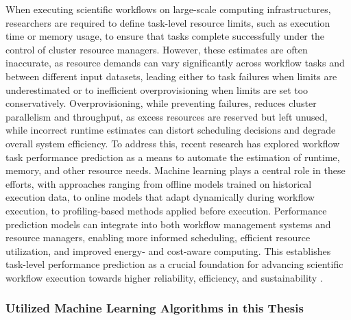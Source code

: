 When executing scientific workflows on large-scale computing infrastructures, researchers are required to define task-level resource limits, such as execution time or memory usage, to ensure that tasks complete successfully under the control of cluster resource managers. However, these estimates are often inaccurate, as resource demands can vary significantly across workflow tasks and between different input datasets, leading either to task failures when limits are underestimated or to inefficient overprovisioning when limits are set too conservatively. Overprovisioning, while preventing failures, reduces cluster parallelism and throughput, as excess resources are reserved but left unused, while incorrect runtime estimates can distort scheduling decisions and degrade overall system efficiency. To address this, recent research has explored workflow task performance prediction as a means to automate the estimation of runtime, memory, and other resource needs. Machine learning plays a central role in these efforts, with approaches ranging from offline models trained on historical execution data, to online models that adapt dynamically during workflow execution, to profiling-based methods applied before execution. Performance prediction models can integrate into both workflow management systems and resource managers, enabling more informed scheduling, efficient resource utilization, and improved energy- and cost-aware computing. This establishes task-level performance prediction as a crucial foundation for advancing scientific workflow execution towards higher reliability, efficiency, and sustainability \cite{bader2025predictingperformancescientificworkflows}.

\subsubsection{Utilized Machine Learning Algorithms in this Thesis}
\label{sec:background_ml_algorithms}

